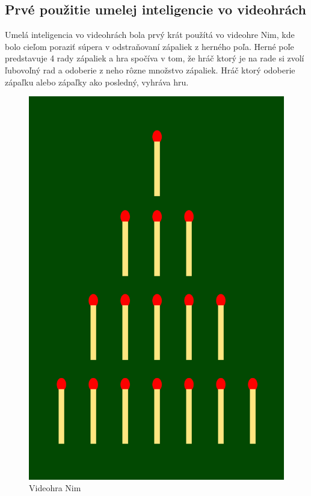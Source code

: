 \documentclass[10pt,oneside,slovak,a4paper]{article}
\begin{document}
\subsection{Prvé použitie umelej inteligencie vo videohrách} \label{kapitola2.1}
Umelá inteligencia vo videohrách bola prvý krát použítá vo videohre Nim, kde bolo cieľom poraziť súpera v odstraňovaní zápaliek z herného poľa. Herné poľe predstavuje 4 rady zápaliek a hra spočíva v tom, že hráč ktorý je na rade si zvolí ľubovoľný rad a odoberie z neho rôzne množstvo zápaliek. Hráč ktorý odoberie zápaľku alebo zápaľky ako posledný, vyhráva hru. 
\begin{figure}[tbh]
	\centering
	\includegraphics[scale=0.06]{NimGame.png}
	\caption{Videohra Nim}
	\label{obr2}
\end{figure}
\end{document}
